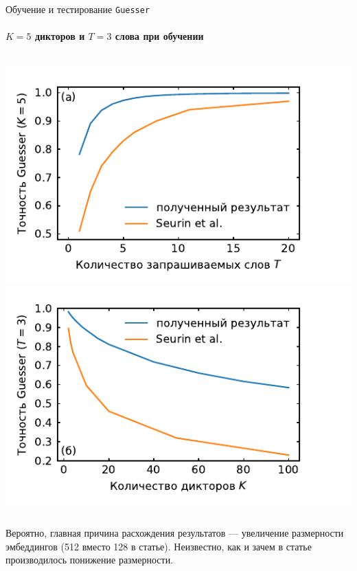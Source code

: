\documentclass[aspectratio=169]{beamer}
\newcommand{\guesser}{\texttt{Guesser}}
\newcommand{\imgscale}{0.8}
\begin{document}
\begin{frame}[t]{Обучение и тестирование \guesser{}}
    \framesubtitle{$K = 5$ дикторов  и $T = 3$ слова при обучении}
    \begin{columns}
        \centering
        \includegraphics[scale=\imgscale]{../plots/word_sweep.pdf}
        \includegraphics[scale=\imgscale]{../plots/guest_sweep.pdf}
    \end{columns}\vspace*{1em}

    Вероятно, главная причина расхождения результатов --- увеличение размерности
    эмбеддингов (512 вместо 128 в статье). Неизвестно, как и зачем в статье
    производилось понижение размерности.
\end{frame}
\end{document}
